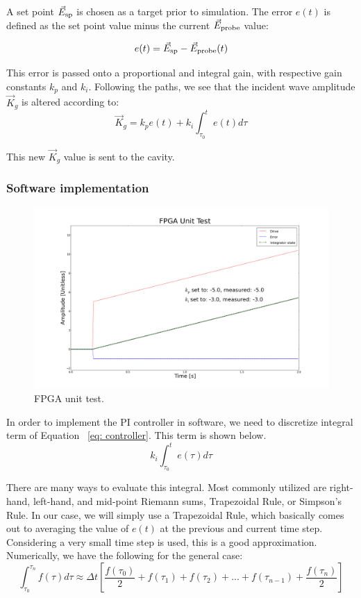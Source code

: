 \documentclass[a4paper,12pt]{article}
\newcommand{\be}{\begin{equation}}
\newcommand{\ee}{\end{equation}}
\begin{document}
A set point $\vec{E}_{\rm sp}$ is chosen as a target prior to simulation. The error $e(t)$ is defined as the set point value minus the current $\vec{E}_{\rm probe}$ value:

\be
e(t) = \vec{E}_{\rm sp} - \vec{E}_{\rm probe}(t)
\ee

\noindent This error is passed onto a proportional and integral gain, with respective gain constants $k_{p}$ and $k_{i}$. Following the paths, we see that the incident wave amplitude $\vec{K}_{g}$ is altered according to: 
\be \label{eq: controller}
\vec{K}_{g} = k_{p} e(t) + k_{i} \int_{\tau_{0}}^{t} e(t) d\tau
\ee

\noindent This new $\vec{K}_{g}$ value is sent to the cavity.

\subsubsection{Software implementation}

\begin{figure}
\centering
\includegraphics[scale=0.25]{../figures/fpga_unit_test.png}
\caption{FPGA unit test.}
\label{fig:fpga_unit_test}
\end{figure}

In order to implement the PI controller in software, we need to discretize integral term of Equation ~\ref{eq: controller}. This term is shown below. 
\be
k_{i} \int_{\tau_{0}}^{t} e(\tau)d\tau
\ee

There are many ways to evaluate this integral. Most commonly utilized are right-hand, left-hand, and mid-point Riemann sums, Trapezoidal Rule, or Simpson's Rule. In our case, we will simply use a Trapezoidal Rule, which basically comes out to averaging the value of $e(t)$ at the previous and current time step. Considering a very small time step is used, this is a good approximation. Numerically, we have the following for the general case:
\be
\int_{\tau_{0}}^{\tau_{n}} f(\tau) d\tau \approx \Delta t
		    \left[\frac{f(\tau_{0})}{2} + f(\tau_{1}) + f(\tau_{2}) + ...
		      + f(\tau_{n-1}) + \frac{f(\tau_{n})}{2}\right]
\ee
\end{document}
